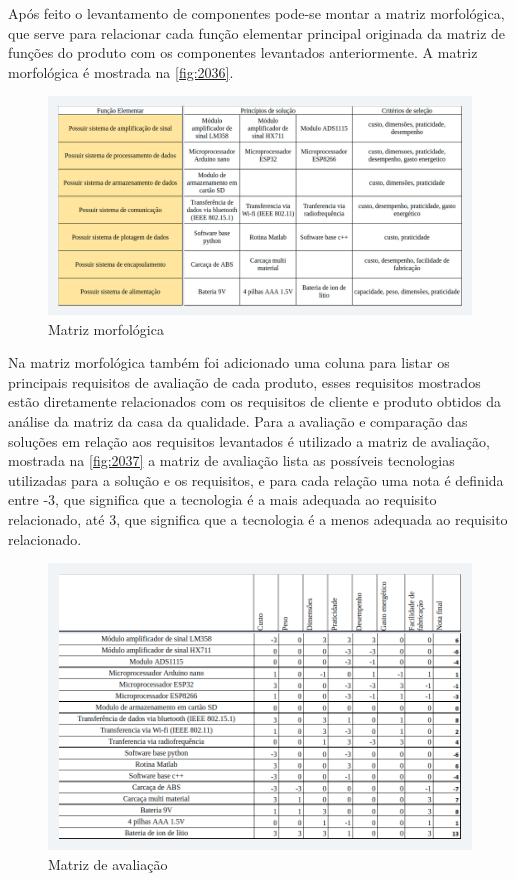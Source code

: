 Após feito o levantamento de componentes pode-se montar a matriz morfológica, que serve para relacionar cada função elementar principal originada da matriz de
funções do produto com os componentes levantados anteriormente.
A matriz morfológica é mostrada na \autoref{fig:2036}.

\begin{figure}[H]
	\caption{\label{fig:2036} Matriz morfológica}
	\begin{center}
		\includegraphics[width=\textwidth]{pictures/2036.png}
	\end{center}
\end{figure}

Na matriz morfológica também foi adicionado uma coluna para listar os principais requisitos de avaliação de cada produto,
esses requisitos mostrados estão diretamente relacionados com os requisitos de cliente e produto obtidos da análise da matriz da casa da qualidade.
Para a avaliação e comparação das soluções em relação aos requisitos levantados é utilizado a matriz de avaliação, mostrada na \autoref{fig:2037} a
matriz de avaliação lista as possíveis tecnologias utilizadas para a solução e os requisitos, e para cada relação uma nota é definida entre -3,
que significa que a tecnologia é a mais adequada ao requisito relacionado, até 3, que significa que a tecnologia é a menos adequada ao requisito relacionado.

\begin{figure}[H]
	\caption{\label{fig:2037} Matriz de avaliação}
	\begin{center}
		\includegraphics[width=\textwidth]{pictures/2037.png}
	\end{center}
\end{figure}


